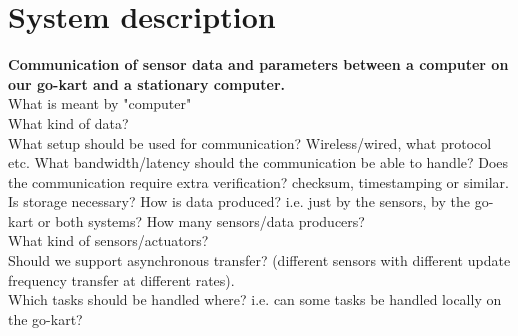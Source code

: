 
\section{System description}
\textbf{Communication of sensor data and parameters between a computer on our go-kart and a stationary computer.}\\
What is meant by "computer"\\
What kind of data?\\
What setup should be used for communication? Wireless/wired, what protocol etc.
What bandwidth/latency should the communication be able to handle?
Does the communication require extra verification? checksum, timestamping or 
similar.
Is storage necessary?
How is data produced? i.e. just by the sensors, by the go-kart or both systems?
How many sensors/data producers?\\
What kind of sensors/actuators?\\
Should we support asynchronous transfer? (different sensors with different 
update frequency transfer at different rates).\\
Which tasks should be handled where? i.e. can some tasks be handled locally on 
the go-kart?